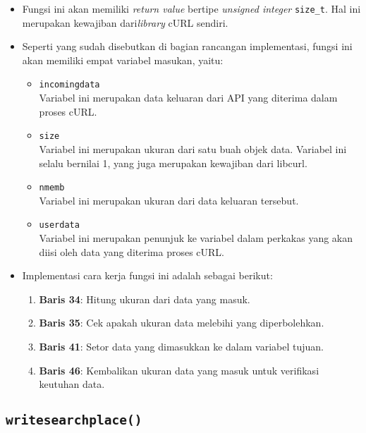 \begin{itemize}
	\item Fungsi ini akan memiliki \textit{return value} bertipe \textit{unsigned integer} \verb|size_t|. Hal ini merupakan kewajiban dari\textit{library} cURL sendiri.
	\item Seperti yang sudah disebutkan di bagian rancangan implementasi, fungsi ini akan memiliki empat variabel masukan, yaitu:
	
	\begin{itemize}
		\item \verb|incomingdata| \\
		Variabel ini merupakan data keluaran dari API yang diterima dalam proses cURL.
		\item \verb|size| \\
		Variabel ini merupakan ukuran dari satu buah objek data. Variabel ini selalu bernilai 1, yang juga merupakan kewajiban dari libcurl.
		\item \verb|nmemb| \\
		Variabel ini merupakan ukuran dari data keluaran tersebut.
		\item \verb|userdata| \\
		Variabel ini merupakan penunjuk ke variabel dalam perkakas yang akan diisi oleh data yang diterima proses cURL.
	\end{itemize}
	
	\item Implementasi cara kerja fungsi ini adalah sebagai berikut:
	
	\begin{enumerate}
		\item \textbf{Baris 34}: Hitung ukuran dari data yang masuk.
		\item \textbf{Baris 35}: Cek apakah ukuran data melebihi yang diperbolehkan.
		\item \textbf{Baris 41}: Setor data yang dimasukkan ke dalam variabel tujuan.
		\item \textbf{Baris 46}: Kembalikan ukuran data yang masuk untuk verifikasi keutuhan data.
	\end{enumerate}
\end{itemize}

\subsection{\texttt{write\textunderscore searchplace()}}
\label{sec:testing-implementation-write-searchplace}


